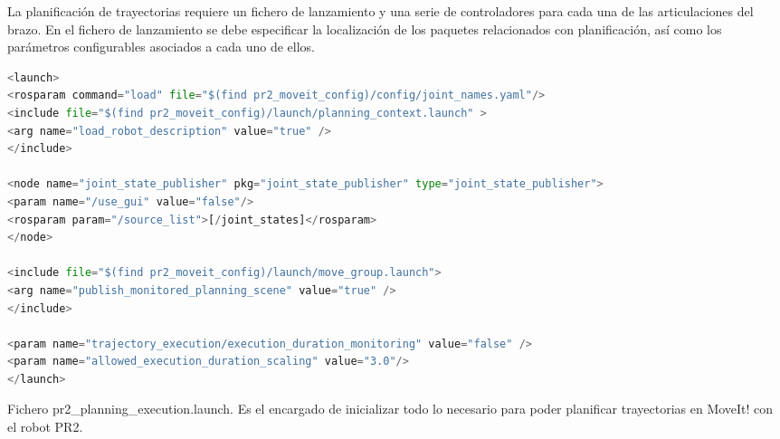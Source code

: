 \documentclass[12pt,spanish,chapterprefix, numbers=noenddot]{book}
\numberwithin{equation}{section}
\numberwithin{figure}{section}
\begin{document}
La planificación de trayectorias requiere un fichero de lanzamiento y una serie de controladores para cada una de las articulaciones del brazo. 
En el fichero de lanzamiento se debe especificar la localización de los paquetes relacionados con planificación, así como los parámetros configurables asociados a cada uno de ellos. 
\vspace{20pt}
\begin{algorithm}[htb!]
	\begin{lstlisting}[breaklines=true,language=python]  
<launch>
<rosparam command="load" file="$(find pr2_moveit_config)/config/joint_names.yaml"/>
<include file="$(find pr2_moveit_config)/launch/planning_context.launch" >
<arg name="load_robot_description" value="true" />
</include>

<node name="joint_state_publisher" pkg="joint_state_publisher" type="joint_state_publisher">
<param name="/use_gui" value="false"/>
<rosparam param="/source_list">[/joint_states]</rosparam>
</node>

<include file="$(find pr2_moveit_config)/launch/move_group.launch">
<arg name="publish_monitored_planning_scene" value="true" />
</include>

<param name="trajectory_execution/execution_duration_monitoring" value="false" />
<param name="allowed_execution_duration_scaling" value="3.0"/>
</launch>
	\end{lstlisting}
\caption{\label{alg:pr2_planning_execution}Fichero pr2\_planning\_execution.launch. Es el encargado de inicializar todo lo necesario para poder planificar trayectorias en MoveIt! con el robot PR2.}
\end{algorithm}
\end{document}
